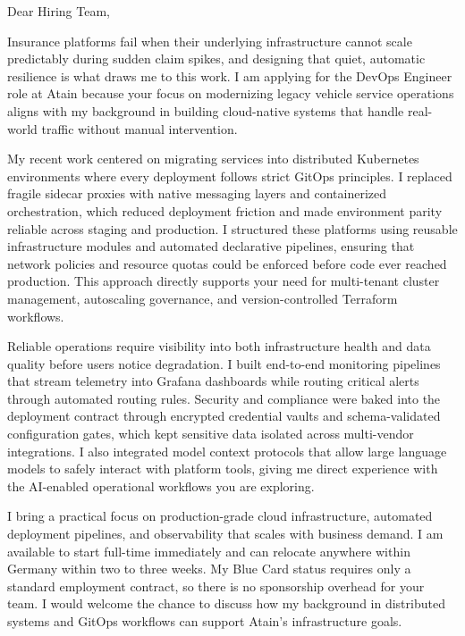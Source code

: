 \documentclass[11pt,a4paper]{coverletter}
\begin{document}

\opening{Dear Hiring Team,}

Insurance platforms fail when their underlying infrastructure cannot scale predictably during sudden claim spikes, and designing that quiet, automatic resilience is what draws me to this work. I am applying for the DevOps Engineer role at Atain because your focus on modernizing legacy vehicle service operations aligns with my background in building cloud-native systems that handle real-world traffic without manual intervention.

My recent work centered on migrating services into distributed Kubernetes environments where every deployment follows strict GitOps principles. I replaced fragile sidecar proxies with native messaging layers and containerized orchestration, which reduced deployment friction and made environment parity reliable across staging and production. I structured these platforms using reusable infrastructure modules and automated declarative pipelines, ensuring that network policies and resource quotas could be enforced before code ever reached production. This approach directly supports your need for multi-tenant cluster management, autoscaling governance, and version-controlled Terraform workflows.

Reliable operations require visibility into both infrastructure health and data quality before users notice degradation. I built end-to-end monitoring pipelines that stream telemetry into Grafana dashboards while routing critical alerts through automated routing rules. Security and compliance were baked into the deployment contract through encrypted credential vaults and schema-validated configuration gates, which kept sensitive data isolated across multi-vendor integrations. I also integrated model context protocols that allow large language models to safely interact with platform tools, giving me direct experience with the AI-enabled operational workflows you are exploring.

I bring a practical focus on production-grade cloud infrastructure, automated deployment pipelines, and observability that scales with business demand. I am available to start full-time immediately and can relocate anywhere within Germany within two to three weeks. My Blue Card status requires only a standard employment contract, so there is no sponsorship overhead for your team. I would welcome the chance to discuss how my background in distributed systems and GitOps workflows can support Atain’s infrastructure goals.
\end{document}
